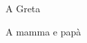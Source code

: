 \thispagestyle{empty}
{}

\vspace*{3cm}

\begin{center}
    A Greta
\end{center}

\medskip

\begin{center}
    A mamma e papà
\end{center}